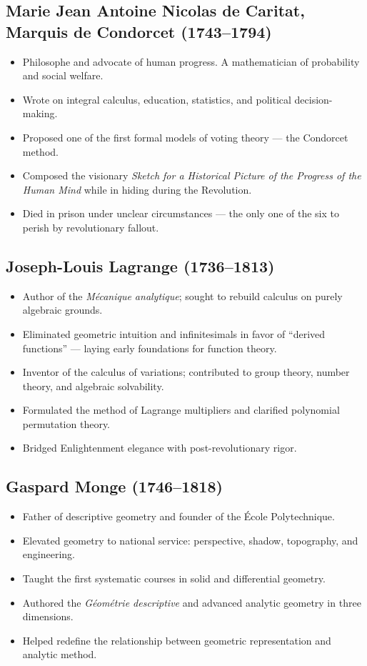\documentclass[9pt]{article}
\begin{document}
\subsection*{Marie Jean Antoine Nicolas de Caritat, Marquis de Condorcet (1743–1794)}
\begin{itemize}
  \item Philosophe and advocate of human progress. A mathematician of probability and social welfare.
  \item Wrote on integral calculus, education, statistics, and political decision-making.
  \item Proposed one of the first formal models of voting theory — the Condorcet method.
  \item Composed the visionary \textit{Sketch for a Historical Picture of the Progress of the Human Mind} while in hiding during the Revolution.
  \item Died in prison under unclear circumstances — the only one of the six to perish by revolutionary fallout.
\end{itemize}

\subsection*{Joseph-Louis Lagrange (1736–1813)}
\begin{itemize}
  \item Author of the \textit{Mécanique analytique}; sought to rebuild calculus on purely algebraic grounds.
  \item Eliminated geometric intuition and infinitesimals in favor of “derived functions” — laying early foundations for function theory.
  \item Inventor of the calculus of variations; contributed to group theory, number theory, and algebraic solvability.
  \item Formulated the method of Lagrange multipliers and clarified polynomial permutation theory.
  \item Bridged Enlightenment elegance with post-revolutionary rigor.
\end{itemize}

\subsection*{Gaspard Monge (1746–1818)}
\begin{itemize}
  \item Father of descriptive geometry and founder of the École Polytechnique.
  \item Elevated geometry to national service: perspective, shadow, topography, and engineering.
  \item Taught the first systematic courses in solid and differential geometry.
  \item Authored the \textit{Géométrie descriptive} and advanced analytic geometry in three dimensions.
  \item Helped redefine the relationship between geometric representation and analytic method.
\end{itemize}
\end{document}
